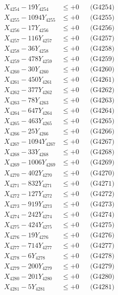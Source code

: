 \documentclass[a4paper,10pt]{article}
\begin{document}
{\begin{align}
X_{4254} - 19Y_{4254} &\leq +0 && \text{(G4254)} \\
X_{4255} - 1094Y_{4255} &\leq +0 && \text{(G4255)} \\
X_{4256} - 17Y_{4256} &\leq +0 && \text{(G4256)} \\
X_{4257} - 116Y_{4257} &\leq +0 && \text{(G4257)} \\
X_{4258} - 36Y_{4258} &\leq +0 && \text{(G4258)} \\
X_{4259} - 478Y_{4259} &\leq +0 && \text{(G4259)} \\
X_{4260} - 30Y_{4260} &\leq +0 && \text{(G4260)} \\
\allowbreak
X_{4261} - 450Y_{4261} &\leq +0 && \text{(G4261)} \\
X_{4262} - 377Y_{4262} &\leq +0 && \text{(G4262)} \\
X_{4263} - 78Y_{4263} &\leq +0 && \text{(G4263)} \\
X_{4264} - 647Y_{4264} &\leq +0 && \text{(G4264)} \\
X_{4265} - 463Y_{4265} &\leq +0 && \text{(G4265)} \\
X_{4266} - 25Y_{4266} &\leq +0 && \text{(G4266)} \\
X_{4267} - 1094Y_{4267} &\leq +0 && \text{(G4267)} \\
X_{4268} - 33Y_{4268} &\leq +0 && \text{(G4268)} \\
X_{4269} - 1006Y_{4269} &\leq +0 && \text{(G4269)} \\
X_{4270} - 402Y_{4270} &\leq +0 && \text{(G4270)} \\
\allowbreak
X_{4271} - 832Y_{4271} &\leq +0 && \text{(G4271)} \\
X_{4272} - 127Y_{4272} &\leq +0 && \text{(G4272)} \\
X_{4273} - 919Y_{4273} &\leq +0 && \text{(G4273)} \\
X_{4274} - 242Y_{4274} &\leq +0 && \text{(G4274)} \\
X_{4275} - 424Y_{4275} &\leq +0 && \text{(G4275)} \\
X_{4276} - 19Y_{4276} &\leq +0 && \text{(G4276)} \\
X_{4277} - 714Y_{4277} &\leq +0 && \text{(G4277)} \\
X_{4278} - 6Y_{4278} &\leq +0 && \text{(G4278)} \\
X_{4279} - 200Y_{4279} &\leq +0 && \text{(G4279)} \\
X_{4280} - 201Y_{4280} &\leq +0 && \text{(G4280)} \\
\allowbreak
X_{4281} - 5Y_{4281} &\leq +0 && \text{(G4281)} \\

\end{align}}
\end{document}

